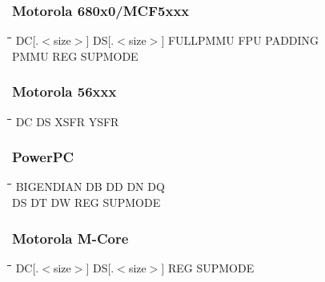 \subsubsection{Motorola 680x0/MCF5xxx}
{\tt\begin{tabbing}
\hspace{3cm}\=\hspace{3cm}\=\hspace{3cm}\=\hspace{3cm}\=\kill
DC[.$<$size$>$]\> DS[.$<$size$>$] \> FULLPMMU    \> FPU         \> PADDING \\
PMMU       \> REG         \> SUPMODE \\
\end{tabbing}}

\subsubsection{Motorola 56xxx}
{\tt\begin{tabbing}
\hspace{3cm}\=\hspace{3cm}\=\hspace{3cm}\=\hspace{3cm}\=\kill
DC         \> DS          \> XSFR        \> YSFR \\
\end{tabbing}}

\subsubsection{PowerPC}
{\tt\begin{tabbing}
\hspace{3cm}\=\hspace{3cm}\=\hspace{3cm}\=\hspace{3cm}\=\kill
BIGENDIAN  \> DB          \> DD          \> DN          \> DQ \\
DS         \> DT          \> DW          \> REG         \> SUPMODE \\
\end{tabbing}}

\subsubsection{Motorola M-Core}
{\tt\begin{tabbing}
\hspace{3cm}\=\hspace{3cm}\=\hspace{3cm}\=\hspace{3cm}\=\kill
DC[.$<$size$>$] \> DS[.$<$size$>$] \> REG \> SUPMODE \\
\end{tabbing}}

